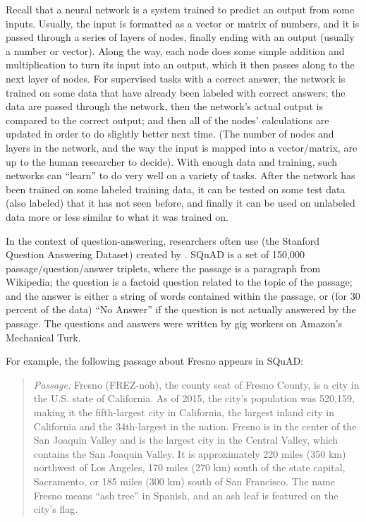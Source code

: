 Recall that a neural network is a system trained to predict an output from some inputs.  Usually, the input is formatted as a vector or matrix of numbers, and it is passed through a series of layers of nodes, finally ending with an output  (usually a number or vector).  Along the way, each node does some simple addition and multiplication to turn its input into an output, which it then passes along to the next layer of nodes.  For supervised tasks with a  correct answer, the network is trained on some data that have already been labeled with correct answers; the data are passed through the network, then the network's actual output is compared to the correct output; and then all of the nodes' calculations are updated in order to do slightly better next time.  (The number of nodes and layers in the network, and the way the input is  mapped into a vector/matrix, are  up to the human researcher to decide). With enough data and training, such networks can ``learn'' to do very well on a variety of tasks.  After the network has been trained on some labeled training data, it can be tested on some test data (also labeled) that it has not seen before, and finally it can be used on unlabeled data more or less similar to what it was trained on.

In the context of question-answering, researchers often use  (the Stanford Question Answering Dataset) created by \citet{Rajpurkar-etal:2016}.  SQuAD is a set of 150,000 passage/question/answer triplets, where the passage is a paragraph from Wikipedia; the question is a factoid question related to the topic of the passage; and the answer is either a string of words contained within the passage, or (for 30 percent of the data) ``No Answer'' if the question is not actually answered by the passage.  The questions and answers were written by gig workers on Amazon's Mechanical Turk.

For example, the following passage about Fresno appears in SQuAD:

\begin{quote}

\emph{Passage:} Fresno (FREZ-noh), the county seat of Fresno County, is a city in the U.S. state of California. As of 2015, the city's population was 520,159, making it the fifth-largest city in California, the largest inland city in California and the 34th-largest in the nation. Fresno is in the center of the San Joaquin Valley and is the largest city in the Central Valley, which contains the San Joaquin Valley. It is approximately 220 miles (350 km) northwest of Los Angeles, 170 miles (270 km) south of the state capital, Sacramento, or 185 miles (300 km) south of San Francisco. The name Fresno means ``ash tree'' in Spanish, and an ash leaf is featured on the city's flag.

\end{quote}

